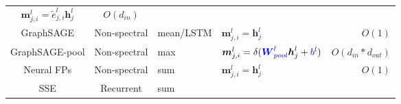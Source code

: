 \begin{table}
\begin{footnotesize}
\begin{tabular}{ccp{8em}p{22em}r}
			$\boldsymbol{m}_{j, i}^l = \tilde{e}_{j, i}^l \boldsymbol{h}_j^l$                                                         &
			$O(d_{in})$                                                                                                                 \\
			GraphSAGE                                                                                                                 &
			Non-spectral                                                                                                              &
			mean/LSTM                                                                                                                 &
			$\boldsymbol{m}_{j, i}^l =  \boldsymbol{h}_j^l$                                                                           &
			$O(1)$                                                                                                                      \\
			GraphSAGE-pool                                                                                                            &
			Non-spectral                                                                                                              &
			max                                                                                                                       &
			$\boldsymbol{m}_{j, i}^l =  \delta(\textcolor{blue}{\boldsymbol{W}^l_{pool}} \boldsymbol{h}_j^l + \textcolor{blue}{b}^l)$ &
			$O(d_{in} * d_{out})$                                                                                                       \\
			Neural FPs                                                                                                                &
			Non-spectral                                                                                                              &
			sum                                                                                                                       &
			$\boldsymbol{m}_{j, i}^l = \boldsymbol{h}_j^l$                                                                            &
			$O(1)$                                                                                                                      \\
			SSE                                                                                                                       &
			Recurrent                                                                                                                 &
			sum                                                                                                                       &

\end{tabular}
\end{footnotesize}
\end{table}

